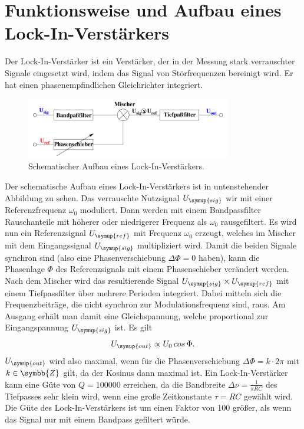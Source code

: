  \section{Funktionsweise und Aufbau eines Lock-In-Verstärkers}
 \label{sec:Theorie}
  Der Lock-In-Verstärker ist ein Verstärker, der in der Messung stark verrauschter
  Signale eingesetzt wird, indem das Signal von Störfrequenzen bereinigt wird.
  Er hat einen phasenempfindlichen Gleichrichter integriert.
  \begin{figure}
    \centering
    \includegraphics[width=0.8\textwidth]{aufbau.png}
    \caption{Schematischer Aufbau eines Lock-In-Verstärkers\cite{sample}.}
    \label{fig:aufbau}
  \end{figure}
  Der schematische Aufbau eines Lock-In-Verstärkers ist in untenstehender Abbildung
  zu sehen.
  Das verrauschte Nutzsignal $U_\symup{sig}$ wir mit einer Referenzfrequenz $\omega_0$
  moduliert. Dann werden mit einem Bandpassfilter Rauschanteile mit höherer oder
  niedrigerer Frequenz als $\omega_0$ rausgefiltert.
  Es wird nun ein Referenzsignal $U_\symup{ref}$ mit Frequenz $\omega_0$ erzeugt,
  welches im Mischer mit dem Eingangssignal $U_\symup{sig}$ multipliziert wird.
  Damit die beiden Signale synchron sind (also eine Phasenverschiebung
  $\Delta\Phi=0$ haben), kann die Phasenlage $\Phi$ des Referenzsignals mit einem
  Phasenschieber verändert werden.
  Nach dem Mischer wird das resultierende Signal $U_\symup{sig} \times U_\symup{ref}$
  mit einem Tiefpassfilter über mehrere Perioden integriert. Dabei mitteln sich
  die Frequenzbeiträge, die nicht synchron zur Modulationsfrequenz sind, raus.
  Am Ausgang erhält man damit eine Gleichspannung, welche proportional zur
  Eingangspannung $U_\symup{sig}$ ist. Es gilt
  \begin{equation}
    U_\symup{out}\propto U_0\, cos\,\Phi.
    \label{eqn:porportionalitaet}
  \end{equation}
  $U_\symup{out}$ wird also maximal, wenn für die Phasenverschiebung
  $\Delta\Phi=k\cdot2\pi$ mit $k\in\symbb{Z}$ gilt, da der Kosinus dann maximal ist.
  Ein Lock-In-Verstärker kann eine Güte von $Q=100000$ erreichen, da die Bandbreite
  $\Delta\nu = \frac{1}{\pi RC}$ des Tiefpasses sehr klein wird, wenn eine große
  Zeitkonstante $\tau=RC$ gewählt wird.
  Die Güte des Lock-In-Verstärkers ist um einen Faktor von 100 größer, als wenn
  das Signal nur mit einem Bandpass gefiltert würde.
  \newpage
